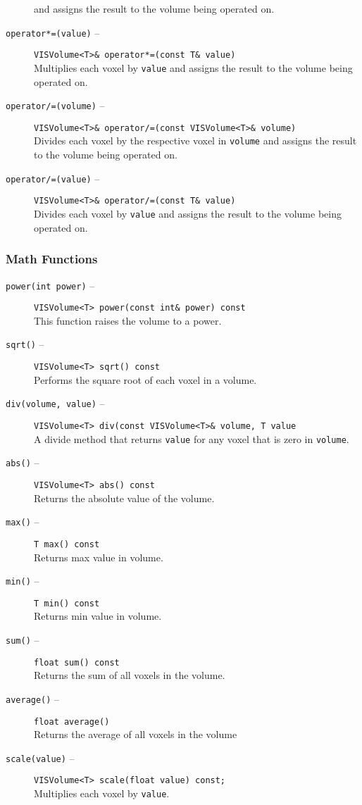 \begin{description}
and assigns the result to the volume being operated on.
\item[{\tt operator*=(value)} --]
{\tt VISVolume<T>\& operator*=(const T\& value)}\\
Multiplies each voxel by {\tt value} and assigns the result to the volume being
operated on.
\item[{\tt operator/=(volume)} --]
{\tt VISVolume<T>\& operator/=(const VISVolume<T>\& volume)}\\
Divides each voxel by the respective voxel in {\tt volume}
and assigns the result to the volume being operated on.
\item[{\tt operator/=(value)} --]
{\tt VISVolume<T>\& operator/=(const T\& value)}\\
Divides each voxel by {\tt value} and assigns the result to the volume being
operated on.
\end{description}

\subsubsection{Math Functions}
\label{vl_mf}
\begin{description}
\item[{\tt power(int power)} --]
{\tt VISVolume<T> power(const int\& power) const}\\
This function raises the volume to a power.  
\item[{\tt sqrt()} --]
{\tt VISVolume<T> sqrt() const}\\
Performs the square root of each voxel in a volume.
\item[{\tt div(volume, value)} --]
{\tt VISVolume<T> div(const VISVolume<T>\& volume, T value}\\
A divide method that returns {\tt value} for any voxel that is zero in 
{\tt volume}.
\item[{\tt abs()} --]
{\tt VISVolume<T> abs() const}\\
Returns the absolute value of the volume.
\item[{\tt max()} --]
{\tt T max() const}\\
Returns max value in volume.
\item[{\tt min()} --]
{\tt T min() const}\\
Returns min value in volume.
\item[{\tt sum()} --]
{\tt float sum() const}\\
Returns the sum of all voxels in the volume.
\item[{\tt average()} --]
{\tt float average()}\\
Returns the average of all voxels in the volume
\item[{\tt scale(value)} --]
{\tt VISVolume<T> scale(float value) const;}\\
Multiplies each voxel by {\tt value}.
\end{description}

